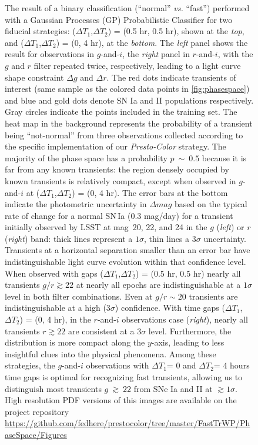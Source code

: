 \documentclass[letterpaper,longauthor,trackchanges,twocolumn,onecolappendix,sort&compress]{aastex62}
\newcommand{\dtone}{\ensuremath{\Delta T_1}}
\newcommand{\dttwo}{\ensuremath{\Delta T_2}}
\begin{document}
\begin{figure}[!t]
\begin{center}
\caption{{The result of a binary classification (``normal'' \emph{vs.} ``fast'') performed with a Gaussian Processes (GP)  Probabilistic Classifier for two fiducial strategies: (\dtone,\dttwo) = (0.5 hr, 0.5 hr), shown at the \emph{top}, and (\dtone,\dttwo) = (0, 4 hr), at the \emph{bottom}. The \emph{left} panel shows the result for observations in $g$-and-$i$, the \emph{right} panel in $r$-and-$i$, with the $g$ and $r$ filter repeated twice, respectively,  leading to a light curve shape constraint $\Delta g$ and $\Delta r$. The red dots indicate transients of interest (same sample as the colored data points in \autoref{fig:phasespace}) and blue and gold dots denote SN Ia and II populations respectively. Gray circles indicate the points included in the training set. The heat map in the background represents the probability of a transient being ``not-normal'' from three observations collected according to the specific implementation of our \emph{Presto-Color}  strategy. The majority of the phase space has a probability $p~\sim~0.5$ because it is far from any known transients: the region densely occupied by known transients is relatively compact, except when observed in $g$-and-$i$ at (\dtone,\dttwo) = (0, 4 hr). The error bars at the bottom indicate the photometric uncertainty in $\Delta mag$ based on the typical rate of change for a normal SN\,Ia (0.3 mag/day) for a transient initially observed by LSST at mag~20, 22, and 24 in the $g$ (\emph{left}) or $r$ (\emph{right}) band: thick lines represent a $1\sigma$, thin lines a $3\sigma$ uncertainty. Transients at a horizontal separation smaller than an error bar have indistinguishable light curve evolution within that confidence level. When observed with gaps (\dtone,\dttwo) = (0.5 hr, 0.5 hr) nearly all transients  $g/r\gtrsim22$ at nearly all epochs are indistinguishable at a $1\sigma$ level in both filter combinations. Even at $g/r\sim20$ transients are indistinguishable at a high ($3\sigma$) confidence.
With time gaps (\dtone,\dttwo) = (0, 4 hr), in the $r$-and-$i$ observations case (\emph{right}), 
nearly all transients $r\gtrsim22$ are consistent at a $3\sigma$  level. Furthermore, the distribution is more compact along the $y$-axis, leading to less insightful clues into the physical phenomena. Among these strategies, the $g$-and-$i$ observations with \dtone= 0 and \dttwo= 4 hours time gaps is optimal for recognizing fast transients, allowing us to distinguish most transients  $g~\gtrsim~22$  from SNe Ia and II at $\gtrsim1\sigma$. High resolution PDF versions of this images are available on the project repository \url{https://github.com/fedhere/prestocolor/tree/master/FastTrWP/PhaseSpace/Figures}}}\label{fig:classifier}
\end{center}\end{figure}
\end{document}

